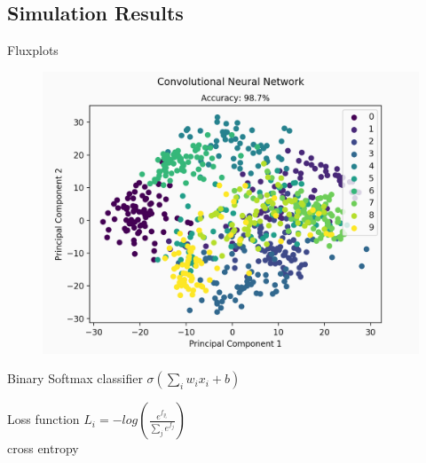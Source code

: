 \documentclass[8pt, aspectratio=169]{beamer}
\begin{document}
\subsection{Simulation Results}

\begin{frame}{Flux}{plots}
	\begin{minipage}{0.56\textwidth}
		\begin{figure}
			\includegraphics[width=\textwidth]{assets/plot.png}
		\end{figure}
	\end{minipage}
	\hfill
	\begin{minipage}{0.38\textwidth}
		\begin{block}{Binary Softmax classifier}
			\centering
			$\sigma(\sum_i w_ix_i + b)$
		\end{block}
		\begin{exampleblock}{Loss function}
			\centering\vspace*{0.1cm}
			$L_i = -log(\frac{e^{f_{y_i}}}{\sum_j e^{f_j}})$\\[0.1cm]
			cross entropy
		\end{exampleblock}
	\end{minipage}
\end{frame}
\end{document}

